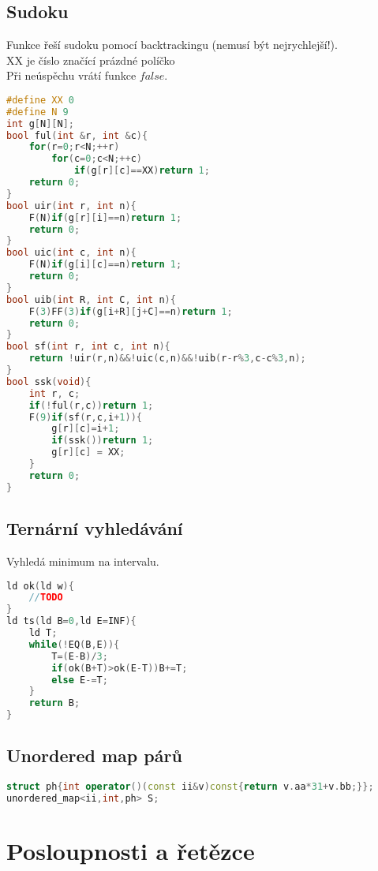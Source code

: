 \documentclass[11pt]{article}
\begin{document}
\subsection{Sudoku}
Funkce řeší sudoku pomocí backtrackingu (nemusí být nejrychlejší!).
\\\textsf{XX} je číslo značící prázdné políčko
\\Při neúspěchu vrátí funkce $false$.
\begin{lstlisting}[language=C++]
#define XX 0
#define N 9
int g[N][N];
bool ful(int &r, int &c){
    for(r=0;r<N;++r)
        for(c=0;c<N;++c)
            if(g[r][c]==XX)return 1;
    return 0;
}
bool uir(int r, int n){
    F(N)if(g[r][i]==n)return 1;
    return 0;
}
bool uic(int c, int n){
    F(N)if(g[i][c]==n)return 1;
    return 0;
}
bool uib(int R, int C, int n){
    F(3)FF(3)if(g[i+R][j+C]==n)return 1;
    return 0;
}
bool sf(int r, int c, int n){
    return !uir(r,n)&&!uic(c,n)&&!uib(r-r%3,c-c%3,n);
}
bool ssk(void){
    int r, c;
    if(!ful(r,c))return 1; 
    F(9)if(sf(r,c,i+1)){
        g[r][c]=i+1;
        if(ssk())return 1;
        g[r][c] = XX;
    }
    return 0;
}
\end{lstlisting}
\subsection{Ternární vyhledávání}
Vyhledá minimum na intervalu.
\begin{lstlisting}[language=C++]
ld ok(ld w){
    //TODO
}
ld ts(ld B=0,ld E=INF){
    ld T;
    while(!EQ(B,E)){
        T=(E-B)/3;
        if(ok(B+T)>ok(E-T))B+=T;
        else E-=T;
    }
    return B;
}
\end{lstlisting}
\subsection{Unordered map párů}
\begin{lstlisting}[language=C++]
struct ph{int operator()(const ii&v)const{return v.aa*31+v.bb;}};
unordered_map<ii,int,ph> S;
\end{lstlisting}
\newpage\section{Posloupnosti a řetězce}
\end{document}
